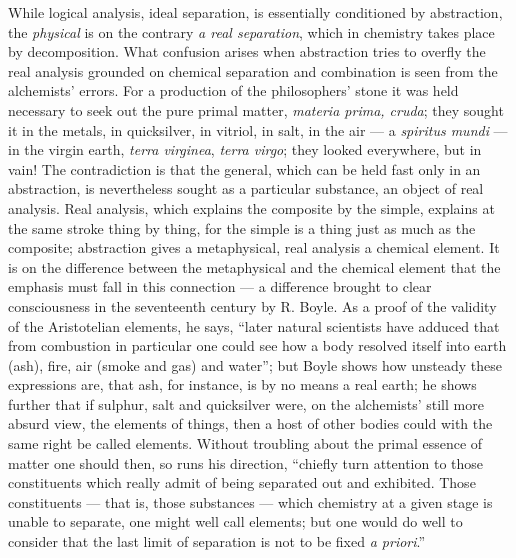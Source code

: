 \documentclass[12pt,a4paper]{book}
\begin{document}
While logical analysis, ideal separation, is essentially conditioned by
abstraction, the \emph{physical} is on the contrary \emph{a real separation},
which in chemistry takes place by decomposition. What confusion arises when
abstraction tries to overfly the real analysis grounded on chemical separation
and combination is seen from the alchemists' errors. For a
production of the philosophers' stone it was held necessary to seek out the
pure primal matter, \textit{materia prima, cruda}; they sought it in the
metals, in quicksilver, in vitriol, in salt, in the air --- a \textit{spiritus
mundi} --- in the virgin earth, \textit{terra virginea}, \textit{terra virgo};
they looked everywhere, but in vain! The contradiction is that the general,
which can be held fast only in an abstraction, is nevertheless sought as a
particular substance, an object of real analysis. Real analysis, which explains
the composite by the simple, explains at the same stroke thing by thing, for
the simple is a thing just as much as the composite; abstraction gives a
metaphysical, real analysis a chemical element. It is on the difference between
the metaphysical and the chemical element that the emphasis must fall in this
connection --- a difference brought to clear consciousness in the seventeenth
century by R. Boyle. As a proof of the validity of the Aristotelian elements,
he says, ``later natural scientists have adduced that from combustion in
particular one could see how a body resolved itself into earth (ash), fire, air
(smoke and gas) and water''; but Boyle shows how unsteady these expressions
are, that ash, for instance, is by no means a real earth; he shows further that
if sulphur, salt and quicksilver were, on the alchemists' still more absurd
view, the elements of things, then a host of other bodies could with the same
right be called elements. Without troubling about the primal essence of matter
one should then, so runs his direction, ``chiefly turn attention to those
constituents which really admit of being separated out and exhibited. Those
constituents --- that is, those substances --- which chemistry at a given stage
is unable to separate, one might well call elements; but one would do well to
consider that the last limit of separation is not to be fixed \textit{a
priori}.''
\end{document}
